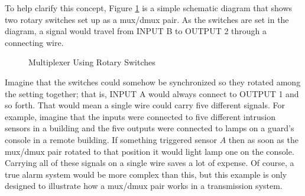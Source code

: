 To help clarify this concept, Figure \ref{CL:fig:multiplexer_using_rotary_switches} is a simple schematic diagram that shows two rotary switches set up as a mux/dmux pair. As the switches are set in the diagram, a signal would travel from \textsf{INPUT B} to \textsf{OUTPUT 2} through a connecting wire. 

\begin{figure}[H]
  \caption{Multiplexer Using Rotary Switches}
  \label{CL:fig:multiplexer_using_rotary_switches}  
  \myfloatalign
\end{figure}

Imagine that the switches could somehow be synchronized so they rotated among the setting together; that is, \textsf{INPUT A}  would always connect to \textsf{OUTPUT 1} and so forth. That would mean a single wire could carry five different signals. For example, imagine that the inputs were connected to five different intrusion sensors in a building and the five outputs were connected to lamps on a guard's console in a remote building. If something triggered sensor $ A $ then as soon as the mux/dmux pair rotated to that position it would light lamp one on the console. Carrying all of these signals on a single wire saves a lot of expense. Of course, a true alarm system would be more complex than this, but this example is only designed to illustrate how a mux/dmux pair works in a transmission system.

